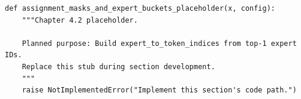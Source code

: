 \begin{lstlisting}[style=bookpython,caption={Planned code placeholder for assignment masks and expert buckets.},label={lst:ch04-assignment-masks-and-expert-buckets}]
def assignment_masks_and_expert_buckets_placeholder(x, config):
    """Chapter 4.2 placeholder.

    Planned purpose: Build expert_to_token_indices from top-1 expert IDs.
    Replace this stub during section development.
    """
    raise NotImplementedError("Implement this section's code path.")
\end{lstlisting}

